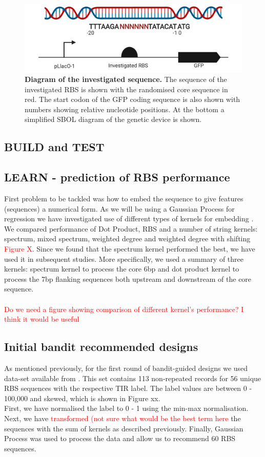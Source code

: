 \documentclass{article}
\begin{document}
\begin{figure}[t]
    \centering
    \includegraphics[scale=0.6]{plots/RBS_anatomy.pdf}
    \caption{\textbf{Diagram of the investigated sequence.} The sequence of the investigated RBS is shown with the randomised core sequence in red. The start codon of the GFP coding sequence is also shown with numbers showing relative nucleotide positions. At the bottom a simplified SBOL diagram of the genetic device is shown.}
    \label{fig: Anatomy of the randomized sequence.}
\end{figure}

\subsection{BUILD and TEST}


\subsection{LEARN - prediction of RBS performance}
First problem to be tackled was how to embed the sequence to give features (sequences) a numerical form. As we will be using a Gaussian Process for regression we have investigated use of different types of kernels for embedding \cite{Ben-Hur2008}. We compared performance of Dot Product, RBS and a number of string kernels: spectrum, mixed spectrum, weighted degree and weighted degree with shifting \textcolor{red}{Figure X}. Since we found that the spectrum kernel performed the best, we have used it in subsequent studies. More specifically, we used a summary of three kernels: spectrum kernel to process the core 6bp and dot product kernel to process the 7bp flanking sequences both upstream and downstream of the core sequence. 
\\
\\
\textcolor{red}{Do we need a figure showing comparison of different kernel's performance? I think it would be useful}

\subsection{Initial bandit recommended designs}
As mentioned previously, for the first round of bandit-guided designs we used data-set available from \textcite{jervis2018machine}. This set contains 113 non-repeated records for 56 unique RBS sequences with the respective TIR label. The label values are between 0 - 100,000 and skewed, which is shown in Figure xx. \\
First, we have normalised the label to 0 - 1 using the min-max normalisation. Next, we have \textcolor{red}{transformed (not sure what would be the best term here} the sequences with the sum of kernels as described previously. Finally, Gaussian Process was used to process the data and allow us to recommend 60 RBS sequences. 
\end{document}
